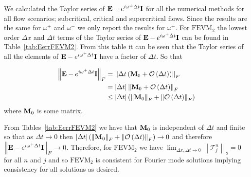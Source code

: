 We calculated the Taylor series of $\mathbf{E} -  e^{i \omega^\pm \Delta t}\mathbf{I}$ for all the numerical methods for all flow scenarios; subcritical, critical and supercritical flows. Since the results are the same for $\omega^+$ and $\omega^-$ we only report the results for $\omega^+$. For $\text{FEVM}_2$ the lowest order $\Delta x$ and $\Delta t$ terms of the Taylor series of $\mathbf{E} -  e^{i \omega^+ \Delta t}\mathbf{I}$ can be found in Table~\ref{tab:EerrFEVM2}. From this table it can be seen that the Taylor series of all the elements of $\mathbf{E} -  e^{i \omega^+ \Delta t}\mathbf{I}$ have a factor of $\Delta t$. So that

\begin{align*}
\left \| \mathbf{E} -  e^{i \omega^+ \Delta t}\mathbf{I} \right \|_F &=  \left \| \Delta t \left(\mathbf{M}_0 +  \mathcal{O}\left(\Delta t\right)\right)\right \|_F  \nonumber\\ &= |\Delta t|  \left \| \mathbf{M}_0 +  \mathcal{O}\left(\Delta t\right)\right \|_F
 \nonumber\\ &\le  |\Delta t| \left(\left \| \mathbf{M}_0 \right \|_F + \left \| \mathcal{O}\left(\Delta t\right)\right \|_F\right)
\end{align*} 
where $\mathbf{M}_0$ is some matrix.

From Tables~\ref{tab:EerrFEVM2} we have that $\mathbf{M}_0$ is independent of $\Delta t$ and finite so that as $\Delta t \rightarrow 0$ then $|\Delta t| \left(\left \| \mathbf{M}_0 \right \|_F + \left \| \mathcal{O}\left(\Delta t\right)\right \|_F\right)  \rightarrow 0$  and therefore  $\left \| \mathbf{E} -  e^{i \omega^+ \Delta t}\mathbf{I} \right \|_F \rightarrow 0$. Therefore, for $\text{FEVM}_2$ we have $ \lim_{\Delta x,\Delta t \rightarrow 0}\left \| \mathcal{T}^n_j\right \|_2 = 0 $ for all $n$ and $j$ and so $\text{FEVM}_2$ is consistent for Fourier mode solutions implying consistency for all solutions as desired. 

